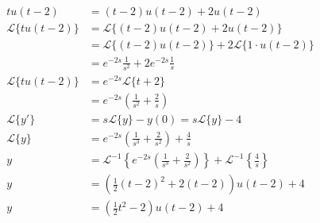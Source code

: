 \documentclass[11pt, a4paper, openany]{book}
\theoremstyle{definition}
\begin{document}
    \begin{align*}
        tu(t-2)&=(t-2)u(t-2)+2u(t-2)\\
        \mathcal{L}\{tu(t-2)\}&=\mathcal{L}\{(t-2)u(t-2)+2u(t-2)\}\\
        &=\mathcal{L}\{(t-2)u(t-2)\}+2\mathcal{L}\{1\cdot u(t-2)\}\\
        &=e^{-2s}\frac{1}{s^2}+2e^{-2s}\frac{1}{s}\\
        \mathcal{L}\{tu(t-2)\}&=e^{-2s}\mathcal{L}\{t+2\}\\
        &=e^{-2s}\left(\frac{1}{s^2}+\frac{2}{s}\right)\\
        \mathcal{L}\{y'\}&=s\mathcal{L}\{y\}-y(0)=s\mathcal{L}\{y\}-4\\
        \mathcal{L}\{y\}&=e^{-2s}\left(\frac{1}{s^3}+\frac{2}{s^2}\right)+\frac{4}{s}\\
        y&=\mathcal{L}^{-1}\left\{e^{-2s}\left(\frac{1}{s^3}+\frac{2}{s^2}\right)\right\}+\mathcal{L}^{-1}\left\{\frac{4}{s}\right\}\\
        y&=\left(\frac{1}{2}(t-2)^2+2(t-2)\right)u(t-2)+4\\
        y&=\left(\frac{1}{2}t^2-2\right)u(t-2)+4
    \end{align*}
\end{document}
